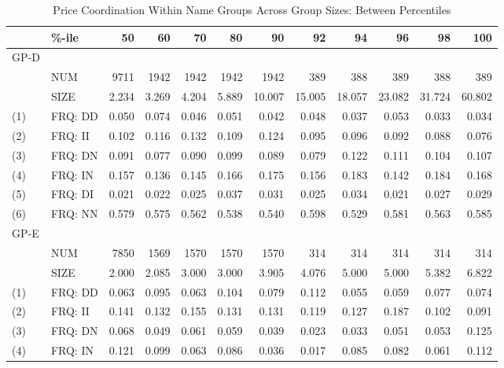 \begin{table}[H]
	\caption{Price Coordination Within Name Groups Across Group Sizes: Between Percentiles}\label{tbl3}
	\begin{tabular}{llrrrrrrrrrr}
		\hline\hline
		& \%-ile  &    50 &    60 &    70 &    80 &     90 &     92 &     94 &     96 &     98 &    100 \\ \hline\hline
		GP-D &         &       &       &       &       &        &        &        &        &        &        \\
		& NUM     &  9711 &  1942 &  1942 &  1942 &   1942 &    389 &    388 &    389 &    388 &    389 \\
		& SIZE    & 2.234 & 3.269 & 4.204 & 5.889 & 10.007 & 15.005 & 18.057 & 23.082 & 31.724 & 60.802 \\
		(1)  & FRQ: DD & 0.050 & 0.074 & 0.046 & 0.051 &  0.042 &  0.048 &  0.037 &  0.053 &  0.033 &  0.034 \\
		(2)  & FRQ: II & 0.102 & 0.116 & 0.132 & 0.109 &  0.124 &  0.095 &  0.096 &  0.092 &  0.088 &  0.076 \\
		(3)  & FRQ: DN & 0.091 & 0.077 & 0.090 & 0.099 &  0.089 &  0.079 &  0.122 &  0.111 &  0.104 &  0.107 \\
		(4)  & FRQ: IN & 0.157 & 0.136 & 0.145 & 0.166 &  0.175 &  0.156 &  0.183 &  0.142 &  0.184 &  0.168 \\
		(5)  & FRQ: DI & 0.021 & 0.022 & 0.025 & 0.037 &  0.031 &  0.025 &  0.034 &  0.021 &  0.027 &  0.029 \\
		(6)  & FRQ: NN & 0.579 & 0.575 & 0.562 & 0.538 &  0.540 &  0.598 &  0.529 &  0.581 &  0.563 &  0.585 \\ \hline
		GP-E &         &       &       &       &       &        &        &        &        &        &        \\
		& NUM     &  7850 &  1569 &  1570 &  1570 &   1570 &    314 &    314 &    314 &    314 &    314 \\
		& SIZE    & 2.000 & 2.085 & 3.000 & 3.000 &  3.905 &  4.076 &  5.000 &  5.000 &  5.382 &  6.822 \\
		(1)  & FRQ: DD & 0.063 & 0.095 & 0.063 & 0.104 &  0.079 &  0.112 &  0.055 &  0.059 &  0.077 &  0.074 \\
		(2)  & FRQ: II & 0.141 & 0.132 & 0.155 & 0.131 &  0.131 &  0.119 &  0.127 &  0.187 &  0.102 &  0.091 \\
		(3)  & FRQ: DN & 0.068 & 0.049 & 0.061 & 0.059 &  0.039 &  0.023 &  0.033 &  0.051 &  0.053 &  0.125 \\
		(4)  & FRQ: IN & 0.121 & 0.099 & 0.063 & 0.086 &  0.036 &  0.017 &  0.085 &  0.082 &  0.061 &  0.112 \\

\end{tabular}
\end{table}
